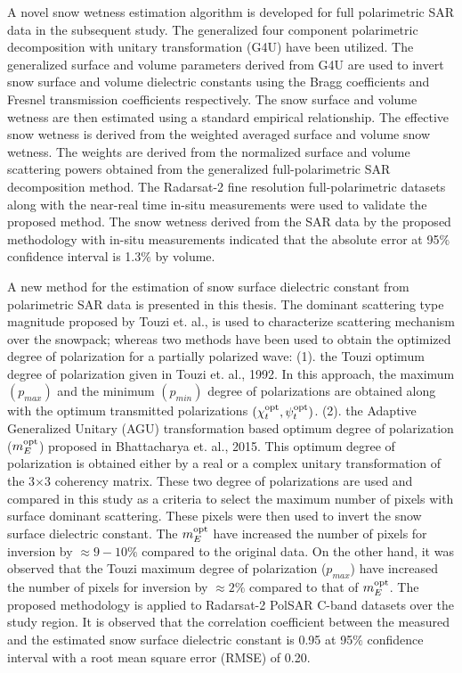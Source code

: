 A novel snow wetness estimation algorithm is developed for full polarimetric SAR data in the subsequent study. The generalized four component polarimetric decomposition with unitary transformation (G4U) have been utilized. The generalized surface and volume parameters derived from G4U are used to invert snow surface and volume dielectric constants using the Bragg coefficients and Fresnel transmission coefficients respectively. The snow surface and volume wetness are then estimated using a standard empirical relationship. The effective snow wetness is derived from the weighted averaged surface and volume snow wetness. The weights are derived from the normalized surface and volume scattering powers obtained from the generalized  full-polarimetric SAR decomposition method. The Radarsat-2 fine resolution full-polarimetric datasets along with the near-real time in-situ measurements were used to validate the proposed method. The snow wetness derived from the SAR data by the proposed methodology with in-situ measurements indicated that the absolute error at 95$\%$ confidence interval is 1.3$\%$ by volume.

A new method for the estimation of snow surface dielectric constant from polarimetric SAR data is presented in this thesis. The dominant scattering type magnitude proposed by Touzi et. al., is used to characterize scattering mechanism over the snowpack; whereas two methods have been used to obtain the optimized degree of polarization for a partially polarized wave: (1). the Touzi optimum degree of polarization given in Touzi et. al., 1992. In this approach, the maximum $(p_{max})$ and the minimum $(p_{min})$ degree of polarizations are obtained along with the optimum transmitted polarizations $(\chi_{t}^{\mbox{\scriptsize opt}},\psi_{t}^{\mbox{\scriptsize opt}})$. (2). the Adaptive Generalized Unitary (AGU) transformation based optimum degree of polarization ($m_{E}^{\mbox{\scriptsize opt}}$) proposed in Bhattacharya et. al., 2015. This optimum degree of polarization is obtained either by a real or a complex unitary transformation of the 3$\times$3 coherency matrix. These two degree of polarizations are used and compared in this study as a criteria to select the maximum number of pixels with surface dominant scattering. These pixels were then used to invert the snow surface dielectric constant. The $m_{E}^{\mbox{\scriptsize opt}}$ have increased the number of pixels for inversion by $\approx 9-10\%$ compared to the original data. On the other hand, it was observed that the Touzi maximum degree of polarization ($p_{max}$) have increased the number of pixels for inversion by $\approx 2\%$ compared to that of $m_{E}^{\mbox{\scriptsize opt}}$. The proposed methodology is applied to Radarsat-2 PolSAR C-band datasets over the study region. It is observed that the correlation coefficient between the measured and the estimated snow surface dielectric constant is 0.95 at 95$\%$ confidence interval with a root mean square error (RMSE) of 0.20. 

